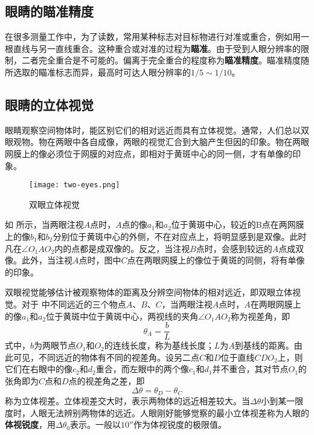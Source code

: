 \subsection{眼睛的瞄准精度}
在很多测量工作中，为了读数，常用某种标志对目标物进行对准或重合，例如用一根直线与另一直线重合。这种重合或对准的过程为\textbf{瞄准}。由于受到人眼分辨率的限制，二者完全重合是不可能的。偏离于完全重合的程度称为\textbf{瞄准精度}。瞄准精度随所选取的瞄准标志而异，最高时可达人眼分辨率的$1/5\sim1/10$。

\subsection{眼睛的立体视觉}
眼睛观察空间物体时，能区别它们的相对远近而具有立体视觉。通常，人们总以双眼观物。物在两眼中各自成像，两眼的视觉汇合到大脑产生但因的印象。物在两眼网膜上的像必须位于网膜的对应点，即相对于黄斑中心的同一侧，才有单像的印象。

\begin{figure}[htbp]
	\centering
	\texttt{[image: two-eyes.png]}
	\caption{双眼立体视觉}
	\label{fig:two-eyes}
\end{figure}

如 所示，当两眼注视$A$点时，$A$点的像$a_1$和$a_2$位于黄斑中心，较近的B点在两网膜上的像$b_1$和$b_2$分别位于黄斑中心的外侧，不在对应点上，将明显感到是双像。此时凡在$\angle O_1AO_2$内的点都是成双像的。反之，当注视$B$点时，会感到较远的$A$点成双像。此外，当注视$A$点时，图中$C$点在两眼网膜上的像位于黄斑的同侧，将有单像的印象。

双眼视觉能够估计被观察物体的距离及分辨空间物体的相对远近，即双眼立体视觉。对于 中不同远近的三个物点$A$、$B$、$C$，当两眼注视$A$点时，$A$在两眼网膜上的像$a_1$和$a_2$位于黄斑中位于黄斑中心，两视线的夹角$\angle O_1AO_2$称为视差角，即
\begin{equation}
\theta_A=\frac{b}{L}
\end{equation}
式中，$b$为两眼节点$O_1$和$O_2$的连线长度，称为基线长度；$L$为$A$到基线的距离。由此可见，不同远近的物体有不同的视差角。设另二点$C$和$D$位于直线$CDO_2$上，则它们在右眼中的像$c_2$和$d_2$重合，而左眼中的两个像$c_1$和$d_1$并不重合，其对节点$O_1$的张角即为$C$点和$D$点的视差角之差，即
\begin{equation}
\Delta\theta=\theta_D-\theta_C
\label{eq:parallax-angle-difference}
\end{equation}
称为立体视差。立体视差交大时，表示两物体的远近相差较大。当$\Delta\theta$小到某一限度时，人眼无法辨别两物体的远近。人眼刚好能够觉察的最小立体视差称为人眼的\textbf{体视锐度}，用$\Delta\theta_0$表示。一般以$10''$作为体视锐度的极限值。

